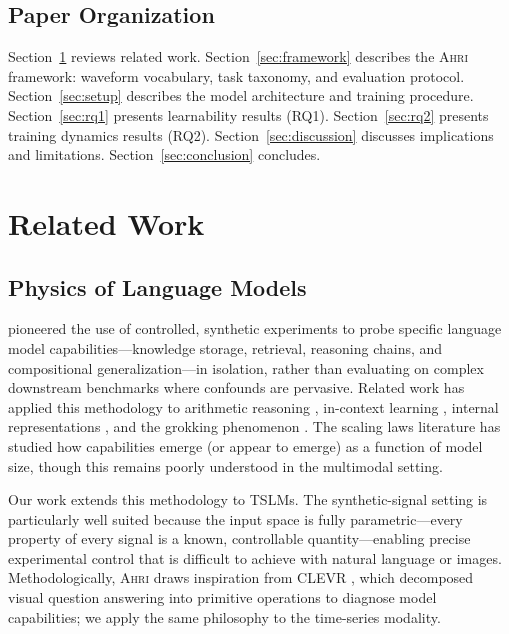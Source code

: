 \documentclass[11pt]{article}
\newcommand{\ahri}{\textsc{Ahri}}
\begin{document}
\subsection{Paper Organization}

Section~\ref{sec:related} reviews related work. Section~\ref{sec:framework} describes the \ahri{} framework: waveform vocabulary, task taxonomy, and evaluation protocol. Section~\ref{sec:setup} describes the model architecture and training procedure. Section~\ref{sec:rq1} presents learnability results (RQ1). Section~\ref{sec:rq2} presents training dynamics results (RQ2). Section~\ref{sec:discussion} discusses implications and limitations. Section~\ref{sec:conclusion} concludes.

\section{Related Work}
\label{sec:related}

\subsection{Physics of Language Models}

\citet{allenzhu2023physics,allenzhu2024physics} pioneered the use of controlled, synthetic experiments to probe specific language model capabilities---knowledge storage, retrieval, reasoning chains, and compositional generalization---in isolation, rather than evaluating on complex downstream benchmarks where confounds are pervasive. Related work has applied this methodology to arithmetic reasoning \citep{nanda2023progress}, in-context learning \citep{olsson2022context}, internal representations \citep{elhage2022toy}, and the grokking phenomenon \citep{power2022grokking}. The scaling laws literature \citep{kaplan2020scaling,wei2022emergent,schaeffer2024mirage} has studied how capabilities emerge (or appear to emerge) as a function of model size, though this remains poorly understood in the multimodal setting.

Our work extends this methodology to TSLMs. The synthetic-signal setting is particularly well suited because the input space is fully parametric---every property of every signal is a known, controllable quantity---enabling precise experimental control that is difficult to achieve with natural language or images. Methodologically, \ahri{} draws inspiration from CLEVR \citep{johnson2017clevr}, which decomposed visual question answering into primitive operations to diagnose model capabilities; we apply the same philosophy to the time-series modality.
\end{document}
